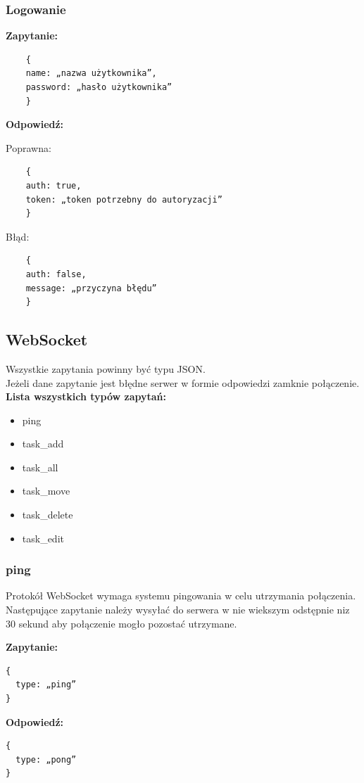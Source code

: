 \documentclass[12pt,a4paper]{article}  %
\begin{document}
	\subsubsection{Logowanie} 

\begin{flushleft}
	\textbf{Zapytanie:}
	\begin{verbatim}
	{
	name: „nazwa użytkownika”,
	password: „hasło użytkownika”
	}
	\end{verbatim}
	\textbf{Odpowiedź:}
	
	Poprawna:
	\begin{verbatim}
	{
	auth: true,
	token: „token potrzebny do autoryzacji”
	}
	\end{verbatim}
	
	Błąd:
	\begin{verbatim}
	{
	auth: false,
	message: „przyczyna błędu”
	}
	\end{verbatim}
\end{flushleft}
\subsection{WebSocket}
Wszystkie zapytania powinny być typu JSON.\\
Jeżeli dane zapytanie jest błędne serwer w formie odpowiedzi zamknie połączenie.\\

\textbf{Lista wszystkich typów zapytań:}
\begin{itemize}
	\item ping
	\item task\_add
	\item task\_all
	\item task\_move
	\item task\_delete
	\item task\_edit
\end{itemize}

\newpage

\subsubsection{ping}
Protokół WebSocket wymaga systemu pingowania w celu utrzymania połączenia. \\
Następujące zapytanie należy wysyłać do serwera w nie wiekszym odstępnie niz 30 sekund aby połączenie mogło pozostać utrzymane.\\
\begin{flushleft}
\textbf{Zapytanie:}
\begin{verbatim}
{
  type: „ping”
}
\end{verbatim}

\textbf{Odpowiedź:}
\begin{verbatim}
{
  type: „pong”
}
\end{verbatim}
\end{flushleft}
\newpage
\end{document}

